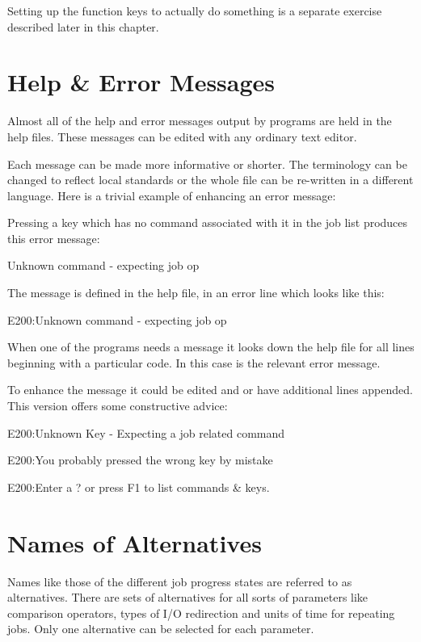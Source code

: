 Setting up the function keys to actually do something is a separate
exercise described later in this chapter.

\section{Help \& Error Messages}
Almost all of the help and error messages output by \ProductName{} programs
are held in the help files. These messages can be edited with any
ordinary text editor.

Each message can be made more informative or shorter. The terminology
can be changed to reflect local standards or the whole file can be
re-written in a different language. Here is a trivial example of
enhancing an error message:

Pressing a key which has no command associated with it in the job list
produces this error message:

\begin{expara}

Unknown command - expecting job op

\end{expara}

The message is defined in the help file, in an error line which looks
like this:

\begin{expara}

E200:Unknown command - expecting job op

\end{expara}

When one of the programs needs a message it looks down the help file for
all lines beginning with a particular code. In this case
 is the relevant error message.

To enhance the message it could be edited and or have additional lines
appended. This version offers some constructive advice:

\begin{expara}

E200:Unknown Key - Expecting a job related command

E200:You probably pressed the wrong key by mistake

E200:Enter a ? or press F1 to list commands \& keys.

\end{expara}

\section{Names of Alternatives}
Names like those of the different job progress states are referred to as
alternatives. There are sets of alternatives for all sorts of
parameters like comparison operators, types of I/O redirection and
units of time for repeating jobs. Only one alternative can be selected
for each parameter.

